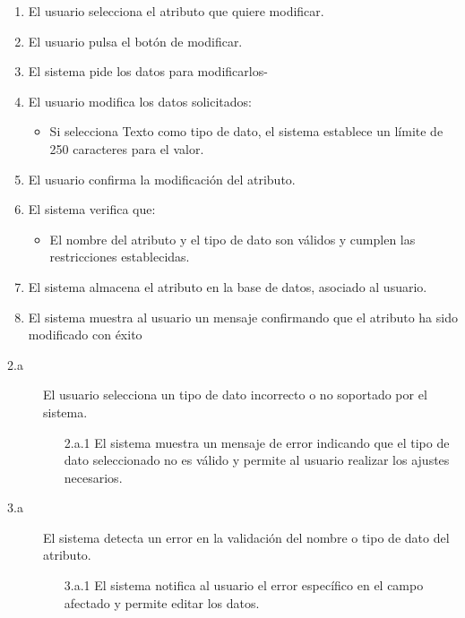 \begin{enumerate}
    \item El usuario selecciona el atributo que quiere modificar.
    \item El usuario pulsa el botón de modificar.
    \item El sistema pide los datos para modificarlos-
    \item El usuario modifica los datos solicitados:
    \begin{itemize}
        \item Si selecciona Texto como tipo de dato, el sistema establece un límite de 250 caracteres para el valor.
    \end{itemize}
    \item El usuario confirma la modificación del atributo.
    \item El sistema verifica que:
    \begin{itemize}
        \item El nombre del atributo y el tipo de dato son válidos y cumplen las restricciones establecidas.
    \end{itemize}
    \item El sistema almacena el atributo en la base de datos, asociado al usuario.
    \item El sistema muestra al usuario un mensaje confirmando que el atributo ha sido modificado con éxito
\end{enumerate}

\begin{description}
    \item[2.a] El usuario selecciona un tipo de dato incorrecto o no soportado por el sistema.
    \begin{enumerate}
        \item[2.a.1] El sistema muestra un mensaje de error indicando que el tipo de dato seleccionado no es válido y permite al usuario realizar los ajustes necesarios.
    \end{enumerate}

    \item[3.a] El sistema detecta un error en la validación del nombre o tipo de dato del atributo.
    \begin{enumerate}
        \item[3.a.1] El sistema notifica al usuario el error específico en el campo afectado y permite editar los datos.
    \end{enumerate}
\end{description}

